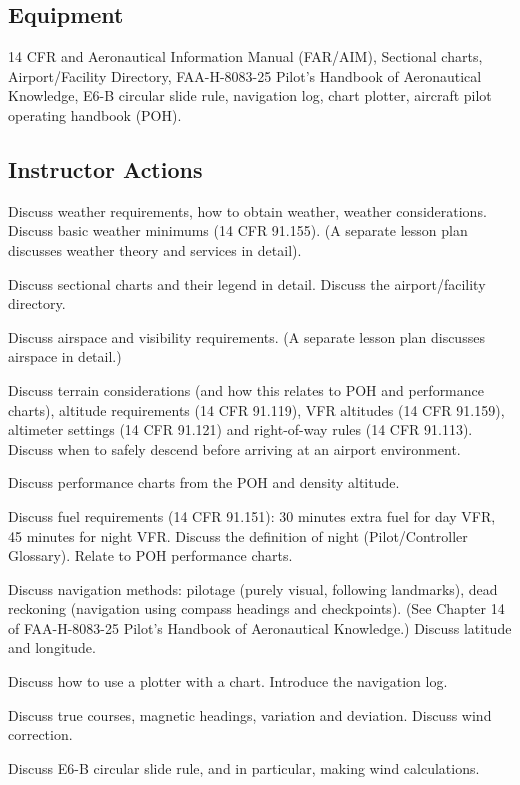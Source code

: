 \subsection{Equipment}

14 CFR and Aeronautical Information Manual (FAR/AIM), Sectional charts,
Airport/Facility Directory, FAA-H-8083-25 Pilot's Handbook of Aeronautical
Knowledge, E6-B circular slide rule, navigation log, chart plotter, aircraft
pilot operating handbook (POH).

\subsection{Instructor Actions}

Discuss weather requirements, how to obtain weather, weather considerations.
Discuss basic weather minimums (14 CFR 91.155). (A separate lesson plan
discusses weather theory and services in detail).

Discuss sectional charts and their legend in detail. Discuss the
airport/facility directory.

Discuss airspace and visibility requirements. (A separate lesson plan discusses
airspace in detail.)

Discuss terrain considerations (and how this relates to POH and performance
charts), altitude requirements (14 CFR 91.119), VFR altitudes (14 CFR 91.159),
altimeter settings (14 CFR 91.121) and right-of-way rules (14 CFR 91.113).
Discuss when to safely descend before arriving at an airport environment.

Discuss performance charts from the POH and density altitude.

Discuss fuel requirements (14 CFR 91.151): 30 minutes extra fuel for day VFR,
45 minutes for night VFR. Discuss the definition of night (Pilot/Controller
Glossary). Relate to POH performance charts.

Discuss navigation methods: pilotage (purely visual, following landmarks), dead
reckoning (navigation using compass headings and checkpoints). (See Chapter 14
of FAA-H-8083-25 Pilot's Handbook of Aeronautical Knowledge.) Discuss latitude
and longitude.

Discuss how to use a plotter with a chart. Introduce the navigation log.

Discuss true courses, magnetic headings, variation and deviation. Discuss wind
correction.

Discuss E6-B circular slide rule, and in particular, making wind calculations.

